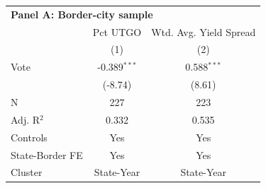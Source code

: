 \begingroup
\centering
\begin{tabular*}{\textwidth}{@{\extracolsep{\fill}}lcc}
\multicolumn{3}{l}{\textbf{Panel A: Border-city sample}}\\

\addlinespace
   \toprule
                   & Pct UTGO       & Wtd. Avg. Yield Spread\\  
                   & (1)            & (2)\\  
   \midrule 
   Vote            & -0.389$^{***}$ & 0.588$^{***}$\\   
                   & (-8.74)       & (8.61)\\   
   \hline
   N    & 227            & 223\\  
   Adj. R$^2$  & 0.332          & 0.535\\  
   Controls                   & Yes            & Yes\\
   State-Border FE & Yes            & Yes\\  
   Cluster              & State-Year & State-Year\\  
   \bottomrule
\end{tabular*}
\par\endgroup
